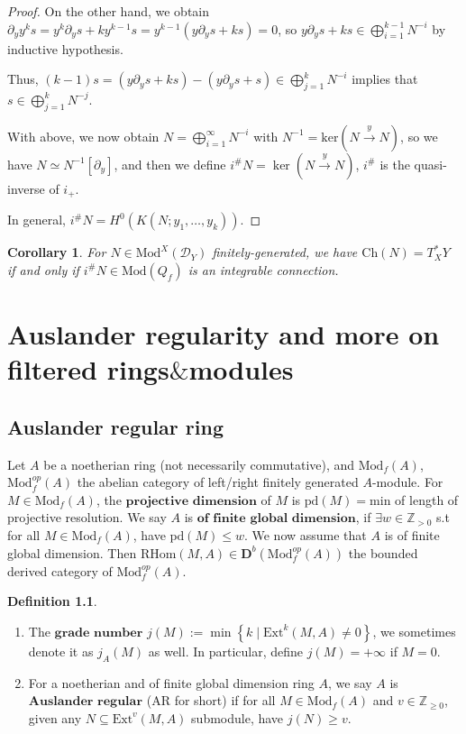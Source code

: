 \documentclass[openany]{book}
\newtheorem{corollary}[theorem]{Corollary}   %
\theoremstyle{definition} %
\newtheorem{definition}[theorem]{Definition} %
\theoremstyle{remark}
\begin{document}
\begin{proof}
    On the other hand, we obtain  $\partial_{y}y^{k}s=y^{k}\partial_{y}s+ky^{k-1}s=y^{k-1}(y\partial_{y}s+ks)=0$, so  $y\partial_{y}s+ks\in \bigoplus\limits_{i=1}^{k-1} N^{-i}$ by inductive hypothesis.

    Thus, $(k-1)s=(y\partial_{y}s+ks)-(y\partial_{y}s+s)\in \bigoplus_{j=1}^{k} N^{-i}$  implies that $s\in \bigoplus_{j=1}^{k} N^{-j}$.

    With above, we now obtain $N=\bigoplus\limits_{i=1}^{\infty}N^{-i}$ with $N^{-1}=\mathrm{ker}(N\xrightarrow{y}N)$, so we have $N\simeq N^{-1}[\partial_{y}]$, and then we define $i^{\#}N = \ker(N \xrightarrow{y} N)$, $i^{\#}$ is the quasi-inverse of $i_{+}$.

    In general, $i^{\#}N = H^{0}(K(N; y_{1}, \ldots, y_{k}))$.
\end{proof}

\begin{corollary}
    For $N \in \text{Mod}^{X}(\mathcal{D}_{Y})$ finitely-generated, we have $\text{Ch}(N) = T_{X}^{*}Y$ if and only if $i^{\#}N \in \text{Mod}(Q_{f})$ is an integrable connection.
\end{corollary}

\chapter{Auslander regularity and more on filtered rings$\&$modules}

\section{Auslander regular ring}
Let $A$ be a noetherian ring (not necessarily commutative), and $\text{Mod}_{f}(A)$, $\text{Mod}_{f}^{op}(A)$ the abelian category of left/right finitely generated $A$-module. For $M \in \text{Mod}_{f}(A)$, the $\textbf{projective dimension}$ of $M$ is $\mathrm{pd}(M) =$min of length of projective resolution. We say $A$ is $\textbf{of finite global dimension}$, if $\exists w \in \mathbb{Z}_{>0}$ s.t for all $M \in \text{Mod}_{f}(A)$, have $\mathrm{pd}(M) \le w$. We now assume that $A$ is of finite global dimension. Then $\text{RHom}(M,A) \in \mathbf{D}^{b}(\text{Mod}^{op}_{f}(A))$ the bounded derived category of $\mathrm{Mod}_{f}^{op}(A)$.

\begin{definition}
    \quad
    \begin{enumerate}
        \item The $\textbf{grade number}$ $j(M) := \min\left\{k \mid \text{Ext}^{k}(M,A) \neq 0\right\}$, we sometimes denote it as  $j_{A}(M)$ as well. In particular, define $j(M) = +\infty$ if $M = 0$.
        \item For a noetherian and of finite global dimension ring $A$, we say $A$ is $\textbf{Auslander regular}$ (AR for short) if for all $M \in \text{Mod}_{f}(A)$ and $v \in \mathbb{Z}_{\ge 0}$, given any $N \subseteq \text{Ext}^{v}(M,A)$ submodule, have $j(N) \ge v$.
    \end{enumerate}
\end{definition}
\end{document}
